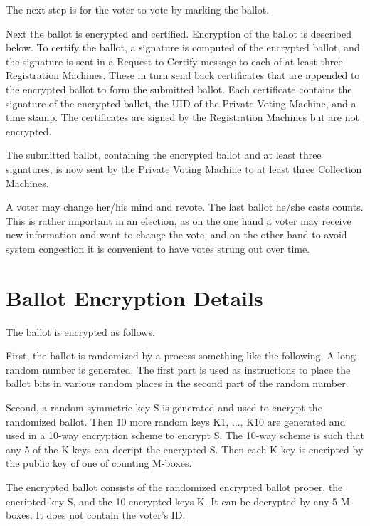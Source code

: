 \documentclass[12pt]{article}
\begin{document}
The next step is for the voter to vote by marking the ballot.

Next the ballot is encrypted and certified.  Encryption of the
ballot is described below.  To certify the ballot, a signature
is computed of the encrypted ballot, and the signature is sent
in a Request to Certify message to each of at least three Registration
Machines.  These in turn send back certificates that are appended
to the encrypted ballot to form the submitted ballot.  Each
certificate contains the signature of the encrypted ballot, the
UID of the Private Voting Machine, and a time stamp.  The certificates
are signed by the Registration Machines but are \underline{not} encrypted.

The submitted ballot, containing the encrypted ballot and
at least three signatures, is now sent by the Private Voting
Machine to at least three Collection Machines.

A voter may change her/his mind and revote.  The last ballot
he/she casts counts.  This is rather important in an election,
as on the one hand a voter may receive new information and
want to change the vote, and on the other hand to avoid system
congestion it is convenient to have votes strung out over time.


\section{Ballot Encryption Details}

The ballot is encrypted as follows.

First, the ballot is randomized by a process something like
the following.  A long random number is generated.  The first
part is used as instructions to place the ballot bits in
various random places in the second part of the random number.

Second, a random symmetric key S is generated and used to encrypt
the randomized ballot.  Then 10 more random keys K1, ..., K10 are generated
and used in a 10-way encryption scheme to encrypt S.  The 10-way
scheme is such that any 5 of the K-keys can decript the encrypted S.
Then each K-key is encripted by the public key of one of counting M-boxes.

The encrypted ballot consists of the randomized encrypted ballot proper,
the encripted key S, and the 10 encrypted keys K.  It can be decrypted
by any 5 M-boxes.  It does \underline{not} contain the voter's ID.
\end{document}
